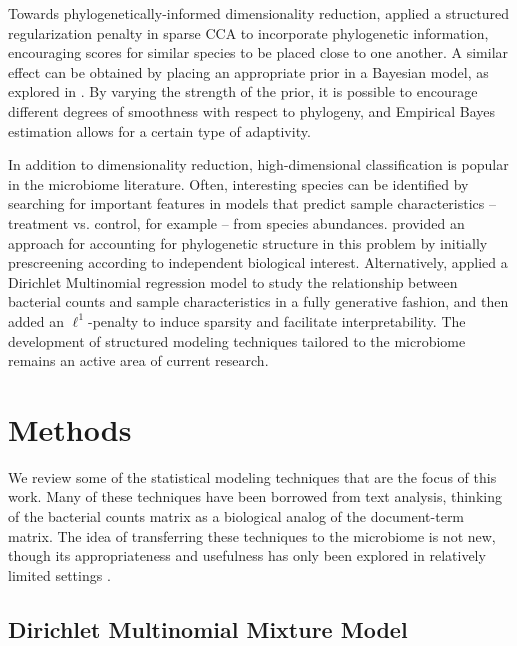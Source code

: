 Towards phylogenetically-informed dimensionality reduction,
\cite{chen2013structure} applied a structured regularization penalty in sparse
CCA to incorporate phylogenetic information, encouraging scores for similar
species to be placed close to one another. A similar effect can be obtained by
placing an appropriate prior in a Bayesian model, as explored in
\cite{fukuyama2017adaptive}. By varying the strength of the prior, it is
possible to encourage different degrees of smoothness with respect to phylogeny,
and Empirical Bayes estimation allows for a certain type of adaptivity.

In addition to dimensionality reduction, high-dimensional classification is
popular in the microbiome literature. Often, interesting species can be
identified by searching for important features in models that predict sample
characteristics -- treatment vs. control, for example -- from species
abundances. \cite{segata2011metagenomic} provided an approach for accounting for
phylogenetic structure in this problem by initially prescreening according to
independent biological interest. Alternatively, \cite{chen2013variable} applied
a Dirichlet Multinomial regression model to study the relationship between
bacterial counts and sample characteristics in a fully generative fashion, and
then added an $\ell^{1}$-penalty to induce sparsity and facilitate
interpretability. The development of structured modeling techniques tailored to
the microbiome remains an active area of current research.

\section{Methods}

We review some of the statistical modeling techniques that are the focus of
this work. Many of these techniques have been borrowed from text analysis,
thinking of the bacterial counts matrix as a biological analog of the
document-term matrix. The idea of transferring these techniques to the
microbiome is not new, though its appropriateness and usefulness has only been
explored in relatively limited settings \citep{schloss2007last,
  holmes2012dirichlet, chen2012estimating, chen2013variable, shafiei2015biomico,
  jiang2017microbiome}.

\subsection{Dirichlet Multinomial Mixture Model}


